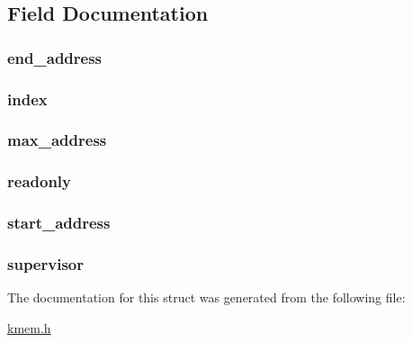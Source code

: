 \subsection{Field Documentation}
\hypertarget{structheap__t_ad770aa56fce7e1ed44266a29def2234e}{
\subsubsection[{end\_\-address}]{ {\bf end\_\-address}}}
\label{structheap__t_ad770aa56fce7e1ed44266a29def2234e}
\hypertarget{structheap__t_a0eef4ef9a0236ead3069bdfd7a1998d4}{
\subsubsection[{index}]{ {\bf index}}}
\label{structheap__t_a0eef4ef9a0236ead3069bdfd7a1998d4}
\hypertarget{structheap__t_a846e12b614d724a6eddfebe50f200f5a}{
\subsubsection[{max\_\-address}]{ {\bf max\_\-address}}}
\label{structheap__t_a846e12b614d724a6eddfebe50f200f5a}
\hypertarget{structheap__t_ae3dd1cfe611a922dc2f36557401a6d8f}{
\subsubsection[{readonly}]{ {\bf readonly}}}
\label{structheap__t_ae3dd1cfe611a922dc2f36557401a6d8f}
\hypertarget{structheap__t_a82c233a1bbc072e5d6a04b9ec5188648}{
\subsubsection[{start\_\-address}]{ {\bf start\_\-address}}}
\label{structheap__t_a82c233a1bbc072e5d6a04b9ec5188648}
\hypertarget{structheap__t_adcd96884114847dfe3f1a765b4ee2ecc}{
\subsubsection[{supervisor}]{ {\bf supervisor}}}
\label{structheap__t_adcd96884114847dfe3f1a765b4ee2ecc}


The documentation for this struct was generated from the following file:\begin{DoxyCompactItemize}
\item 
\hyperlink{kmem_8h}{kmem.h}\end{DoxyCompactItemize}
